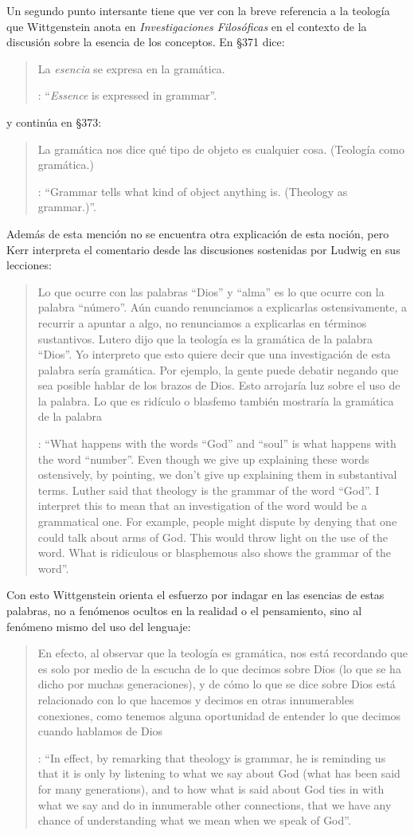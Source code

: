 Un segundo punto intersante tiene que ver con la breve referencia a la teología que Wittgenstein anota en \emph{Investigaciones Filosóficas} en el contexto de la discusión sobre la esencia de los conceptos. En \S371 dice: \blockquote[{\Cite[\S371]{wittgenstein1953phiinv}}: \enquote{\emph{Essence} is expressed in grammar}.]{La \emph{esencia} se expresa en la gramática.} y continúa en \S373: \blockquote[{\Cite[\S371]{wittgenstein1953phiinv}}: \enquote{Grammar tells what kind of object anything is. (Theology as grammar.)}.]{La gramática nos dice qué tipo de objeto es cualquier cosa. (Teología como gramática.)} Además de esta mención no se encuentra otra explicación de esta noción, pero Kerr interpreta el comentario desde las discusiones sostenidas por Ludwig en sus lecciones: \blockquote[{\Cite[32]{ambrose2001lectures}}: \enquote{What happens with the words ``God'' and ``soul'' is what happens with the word ``number''. Even though we give up explaining these words ostensively, by pointing, we don't give up explaining them in substantival terms. \textelp{} Luther said that theology is the grammar of the word ``God''. I interpret this to mean that an investigation of the word would be a grammatical one. For example, people might dispute by denying that one could talk about arms of God. This would throw light on the use of the word. What is ridiculous or blasphemous also shows the grammar of the word}.]{Lo que ocurre con las palabras ``Dios'' y ``alma'' es lo que ocurre con la palabra ``número''. Aún cuando renunciamos a explicarlas ostensivamente, a recurrir a apuntar a algo, no renunciamos a explicarlas en términos sustantivos. \textelp{} Lutero dijo que la teología es la gramática de la palabra ``Dios''. Yo interpreto que esto quiere decir que una investigación de esta palabra sería gramática. Por ejemplo, la gente puede debatir negando que sea posible hablar de los brazos de Dios. Esto arrojaría luz sobre el uso de la palabra. Lo que es ridículo o blasfemo también mostraría la gramática de la palabra}. Con esto Wittgenstein orienta el esfuerzo por indagar en las esencias de estas palabras, no a fenómenos ocultos en la realidad o el pensamiento, sino al fenómeno mismo del uso del lenguaje: \blockquote[{\Cite[148-149]{kerr1997theo}}: \enquote{In effect, by remarking that theology is grammar, he is reminding us that it is only by listening to what we say about God (what has been said for many generations), and to how what is said about God ties in with what we say and do in innumerable other connections, that we have any chance of understanding what we mean when we speak of God}.]{En efecto, al observar que la teología es gramática, nos está recordando que es solo por medio de la escucha de lo que decimos sobre Dios (lo que se ha dicho por muchas generaciones), y de cómo lo que se dice sobre Dios está relacionado con lo que hacemos y decimos en otras innumerables conexiones, como tenemos alguna oportunidad de entender lo que decimos cuando hablamos de Dios}.
